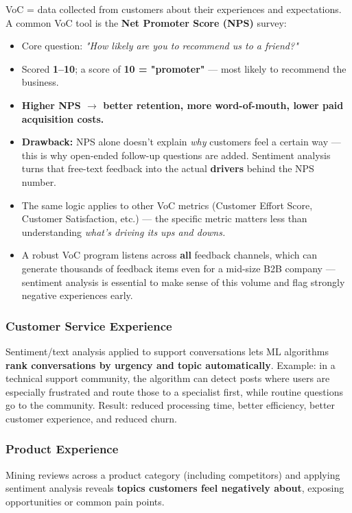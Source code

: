 \documentclass[12pt,openany]{book}
\begin{document}
VoC = data collected from customers about their experiences and expectations. A common VoC tool is the \textbf{Net Promoter Score (NPS)} survey:
\begin{itemize}[leftmargin=*]
    \item Core question: \textit{"How likely are you to recommend us to a friend?"}
    \item Scored \textbf{1--10}; a score of \textbf{10 = "promoter"} --- most likely to recommend the business.
    \item \textbf{Higher NPS \(\rightarrow\) better retention, more word-of-mouth, lower paid acquisition costs.}
    \item \textbf{Drawback:} NPS alone doesn't explain \textit{why} customers feel a certain way --- this is why open-ended follow-up questions are added. Sentiment analysis turns that free-text feedback into the actual \textbf{drivers} behind the NPS number.
    \item The same logic applies to other VoC metrics (Customer Effort Score, Customer Satisfaction, etc.) --- the specific metric matters less than understanding \textit{what's driving its ups and downs.}
    \item A robust VoC program listens across \textbf{all} feedback channels, which can generate thousands of feedback items even for a mid-size B2B company --- sentiment analysis is essential to make sense of this volume and flag strongly negative experiences early.
\end{itemize}

\subsubsection{Customer Service Experience}

Sentiment/text analysis applied to support conversations lets ML algorithms \textbf{rank conversations by urgency and topic automatically}. Example: in a technical support community, the algorithm can detect posts where users are especially frustrated and route those to a specialist first, while routine questions go to the community. Result: reduced processing time, better efficiency, better customer experience, and reduced churn.

\subsubsection{Product Experience}

Mining reviews across a product category (including competitors) and applying sentiment analysis reveals \textbf{topics customers feel negatively about}, exposing opportunities or common pain points.
\end{document}
